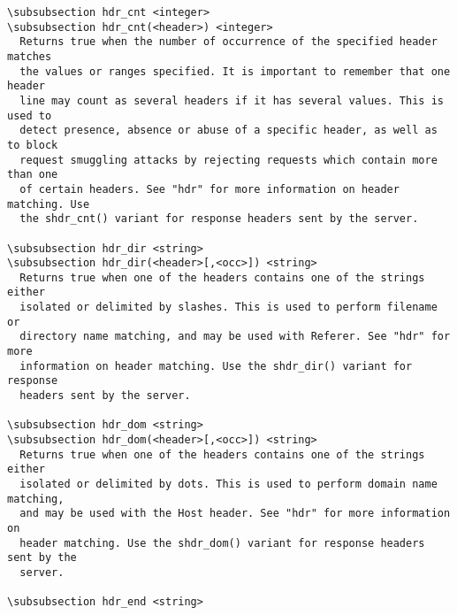 \begin{verbatim}
\subsubsection hdr_cnt <integer>
\subsubsection hdr_cnt(<header>) <integer>
  Returns true when the number of occurrence of the specified header matches
  the values or ranges specified. It is important to remember that one header
  line may count as several headers if it has several values. This is used to
  detect presence, absence or abuse of a specific header, as well as to block
  request smuggling attacks by rejecting requests which contain more than one
  of certain headers. See "hdr" for more information on header matching. Use
  the shdr_cnt() variant for response headers sent by the server.

\subsubsection hdr_dir <string>
\subsubsection hdr_dir(<header>[,<occ>]) <string>
  Returns true when one of the headers contains one of the strings either
  isolated or delimited by slashes. This is used to perform filename or
  directory name matching, and may be used with Referer. See "hdr" for more
  information on header matching. Use the shdr_dir() variant for response
  headers sent by the server.

\subsubsection hdr_dom <string>
\subsubsection hdr_dom(<header>[,<occ>]) <string>
  Returns true when one of the headers contains one of the strings either
  isolated or delimited by dots. This is used to perform domain name matching,
  and may be used with the Host header. See "hdr" for more information on
  header matching. Use the shdr_dom() variant for response headers sent by the
  server.

\subsubsection hdr_end <string>

\end{verbatim}
